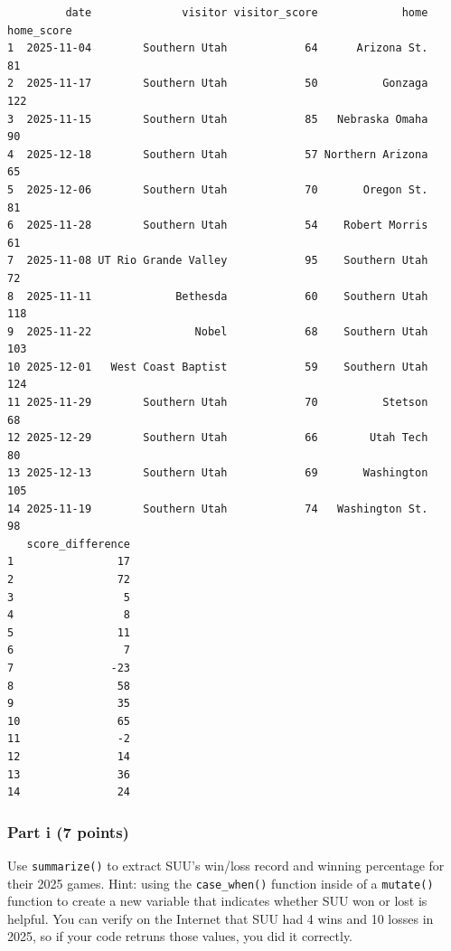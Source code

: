 \documentclass[
  letterpaper,
  DIV=11,
  numbers=noendperiod]{scrartcl}
\begin{document}
\begin{verbatim}
         date              visitor visitor_score             home home_score
1  2025-11-04        Southern Utah            64      Arizona St.         81
2  2025-11-17        Southern Utah            50          Gonzaga        122
3  2025-11-15        Southern Utah            85   Nebraska Omaha         90
4  2025-12-18        Southern Utah            57 Northern Arizona         65
5  2025-12-06        Southern Utah            70       Oregon St.         81
6  2025-11-28        Southern Utah            54    Robert Morris         61
7  2025-11-08 UT Rio Grande Valley            95    Southern Utah         72
8  2025-11-11             Bethesda            60    Southern Utah        118
9  2025-11-22                Nobel            68    Southern Utah        103
10 2025-12-01   West Coast Baptist            59    Southern Utah        124
11 2025-11-29        Southern Utah            70          Stetson         68
12 2025-12-29        Southern Utah            66        Utah Tech         80
13 2025-12-13        Southern Utah            69       Washington        105
14 2025-11-19        Southern Utah            74   Washington St.         98
   score_difference
1                17
2                72
3                 5
4                 8
5                11
6                 7
7               -23
8                58
9                35
10               65
11               -2
12               14
13               36
14               24
\end{verbatim}

\subsubsection{Part i (7 points)}\label{part-i-7-points}

Use \texttt{summarize()} to extract SUU's win/loss record and winning
percentage for their 2025 games. Hint: using the \texttt{case\_when()}
function inside of a \texttt{mutate()} function to create a new variable
that indicates whether SUU won or lost is helpful. You can verify on the
Internet that SUU had 4 wins and 10 losses in 2025, so if your code
retruns those values, you did it correctly.
\end{document}
